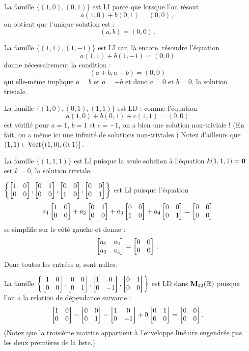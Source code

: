 \begin{myexample}\label{R2} La famille $\{(1,0), (0,1)\}$ est LI parce que lorsque l'on résout 
$$
a(1,0)+b(0,1) = (0,0)\,,
$$
on obtient que l'unique solution est :
$$
(a,b) = (0,0)\,.
$$
\end{myexample}

\begin{myexample} La famille $\{(1,1), (1,-1)\}$ est LI car, l\`a encore, résoudre l'équation
$$
a(1,1)+b(1,-1) = (0,0)
$$
donne nécessairement la condition :
$$
(a+b,a-b)= (0,0)
$$
 qui elle-même implique $a=b$ et $a=-b$ et donc $a=0$ et $b=0$, la solution triviale. \end{myexample}

\begin{myexample} La famille $\{(1,0), (0,1), (1,1)\}$ est LD : comme
l'équation
$$
a(1,0) + b(0,1) + c(1,1) = (0,0)
$$
est vérifié pour $a=1$, $b=1$ et $c=-1$, on a bien une solution non-triviale !  (En fait, on a même ici
une infinité de solutions non-triviales.)  Notez d'ailleurs que $(1,1) \in \textrm{Vect}\{(1,0),(0,1)\}$.
\end{myexample}

\begin{myexample} La famille $\{ (1,1,1)\}$ est LI puisque la seule solution à l'équation $k(1,1,1)=\mathbf{0}$ est $k=0$, la solution triviale. \end{myexample}

\begin{myexample} $\left\{ \left[ \begin{matrix} 1&0\\0&0 \end{matrix} \right], \left[ \begin{matrix} 0&1\\0&0 \end{matrix} \right], \left[ \begin{matrix} 0&0\\1&0 \end{matrix} \right], \left[ \begin{matrix} 0&0\\0&1 \end{matrix} \right] \right\}$ est LI puisque l'équation
$$
a_1\left[ \begin{matrix} 1&0\\0&0 \end{matrix} \right]+a_2\left[ \begin{matrix} 0&1\\0&0 \end{matrix} \right]+a_3\left[ \begin{matrix} 0&0\\1&0 \end{matrix} \right]+a_4 \left[ \begin{matrix} 0&0\\0&1 \end{matrix} \right] =
 \left[ \begin{matrix} 0&0\\0&0 \end{matrix} \right]
$$
se simplifie sur le côté gauche et donne :
$$
\left[ \begin{matrix} a_1 & a_2 \\ a_3 & a_4 \end{matrix} \right] =  \left[ \begin{matrix} 0&0\\0&0 \end{matrix} \right]\,.
$$
Donc toutes les entr\'ees $a_i$ sont nulles. \end{myexample}

\begin{myexample} La famille $\left\{ \left[ \begin{matrix} 1&0\\0&0 \end{matrix} \right], \left[ \begin{matrix} 0&0\\0&1 \end{matrix} \right],  \left[ \begin{matrix} 1&0\\0&-1 \end{matrix} \right], \left[ \begin{matrix} 0&1\\0&0 \end{matrix} \right] \right\}$ est LD dans $\mathbf{M}_{22}(\mathbb{R})$ puisque  l'on a la relation de dépendance suivante :
$$
\left[ \begin{matrix} 1&0\\0&0 \end{matrix} \right] - \left[ \begin{matrix} 0&0\\0&1 \end{matrix} \right] - \left[ \begin{matrix} 1&0\\0&-1 \end{matrix} \right] + 0\left[ \begin{matrix} 0&1\\0&0 \end{matrix} \right] = \left[ \begin{matrix} 0&0\\0&0 \end{matrix} \right].
$$
(Notez que la troisième matrice appartient \`a l'enveloppe lin\'eaire engendr\'ee pas les deux premières de la liste.) \end{myexample}

